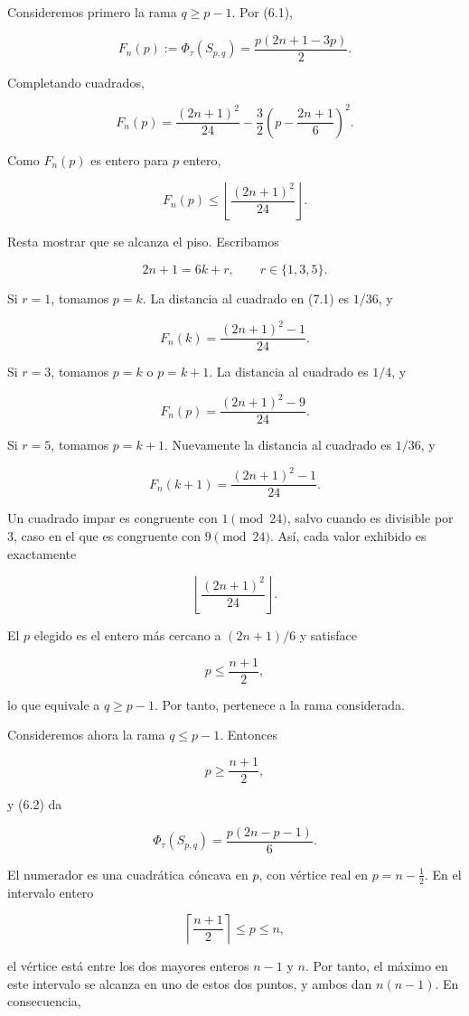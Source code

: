 \documentclass[spanish,11pt,a4paper]{article}
\begin{document}
Consideremos primero la rama \(q\ge p-1\). Por (6.1),

\[
F_n(p)
:=
\Phi_\tau(S_{p,q})
=
\frac{p(2n+1-3p)}2.
\]

Completando cuadrados,

\[
F_n(p)
=
\frac{(2n+1)^2}{24}
-
\frac32
\left(
p-\frac{2n+1}{6}
\right)^2.
\tag{7.1}
\]

Como \(F_n(p)\) es entero para \(p\) entero,

\[
F_n(p)
\le
\left\lfloor\frac{(2n+1)^2}{24}\right\rfloor.
\]

Resta mostrar que se alcanza el piso. Escribamos

\[
2n+1=6k+r,
\qquad
r\in\{1,3,5\}.
\]

Si \(r=1\), tomamos \(p=k\). La distancia al cuadrado en (7.1) es
\(1/36\), y

\[
F_n(k)
=
\frac{(2n+1)^2-1}{24}.
\]

Si \(r=3\), tomamos \(p=k\) o \(p=k+1\). La distancia al cuadrado es
\(1/4\), y

\[
F_n(p)
=
\frac{(2n+1)^2-9}{24}.
\]

Si \(r=5\), tomamos \(p=k+1\). Nuevamente la distancia al cuadrado es
\(1/36\), y

\[
F_n(k+1)
=
\frac{(2n+1)^2-1}{24}.
\]

Un cuadrado impar es congruente con \(1\pmod{24}\), salvo cuando es
divisible por \(3\), caso en el que es congruente con \(9\pmod{24}\).
Así, cada valor exhibido es exactamente

\[
\left\lfloor\frac{(2n+1)^2}{24}\right\rfloor.
\]

El \(p\) elegido es el entero más cercano a \((2n+1)/6\) y satisface

\[
p\le\frac{n+1}{2},
\]

lo que equivale a \(q\ge p-1\). Por tanto, pertenece a la rama
considerada.

Consideremos ahora la rama \(q\le p-1\). Entonces

\[
p\ge\frac{n+1}{2},
\]

y (6.2) da

\[
\Phi_\tau(S_{p,q})
=
\frac{p(2n-p-1)}6.
\]

El numerador es una cuadrática cóncava en \(p\), con vértice real en
\(p=n-\tfrac12\). En el intervalo entero

\[
\left\lceil\frac{n+1}{2}\right\rceil
\le p\le n,
\]

el vértice está entre los dos mayores enteros \(n-1\) y \(n\). Por
tanto, el máximo en este intervalo se alcanza en uno de estos dos
puntos, y ambos dan \(n(n-1)\). En consecuencia,
\end{document}
